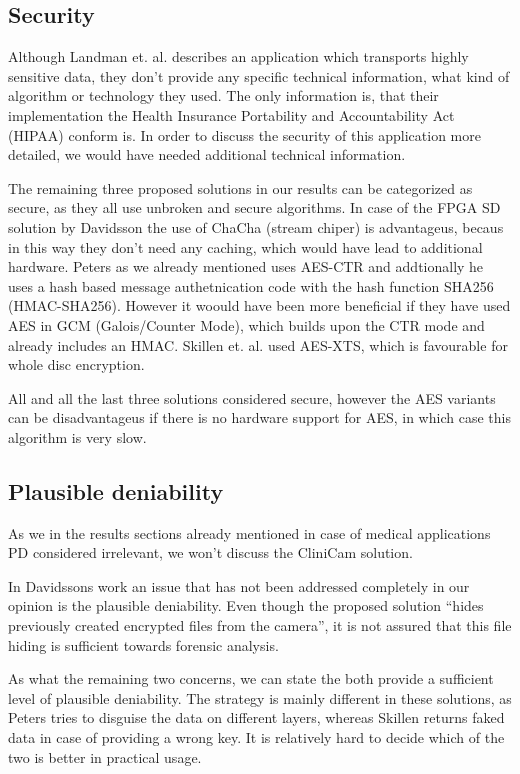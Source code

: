 \documentclass[12pt,a4paper,titlepage,oneside]{scrartcl}
\begin{document}
\subsection{Security}
Although Landman et. al. describes an application which transports highly sensitive data, they don't provide any specific technical information, what kind of algorithm or technology they used.
The only information is, that their implementation the Health Insurance Portability and Accountability Act (HIPAA) conform is.
In order to discuss the security of this application more detailed, we would have needed additional technical information.

The remaining three proposed solutions in our results can be categorized as secure, as they all use unbroken and secure algorithms.
In case of the FPGA SD solution by Davidsson the use of ChaCha (stream chiper) is advantageus, becaus in this way they don't need any caching, which would have lead to additional hardware.
Peters as we already mentioned uses AES-CTR and addtionally he uses a hash based message authetnication code with the hash function SHA256 (HMAC-SHA256).
However it woould have been more beneficial if they have used AES in GCM (Galois/Counter Mode), which builds upon the CTR mode and already includes an HMAC. \cite{mcgrew2004security}
Skillen et. al. used AES-XTS, which is favourable for whole disc encryption.

All and all the last three solutions considered secure, however the AES variants can be disadvantageus if there is no hardware support for AES, in which case this algorithm is very slow.

\subsection{Plausible deniability}
As we in the results sections already mentioned in case of medical applications PD considered irrelevant, we won't discuss the CliniCam solution.

In Davidssons work an issue that has not been addressed completely in our opinion is the plausible deniability.
Even though the proposed solution ``hides previously created encrypted files from the camera'', it is not assured that this file hiding is sufficient towards forensic analysis.

As what the remaining two concerns, we can state the both provide a sufficient level of plausible deniability.
The strategy is mainly different in these solutions, as Peters tries to disguise the data on different layers, whereas Skillen returns faked data in case of providing a wrong key.
It is relatively hard to decide which of the two is better in practical usage.
\end{document}
